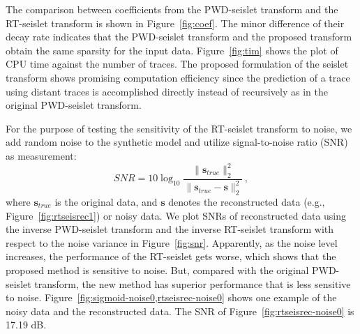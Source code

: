 
    The comparison between coefficients from the PWD-seislet transform and 
    the RT-seislet transform is shown in Figure~\ref{fig:coef}. 
    The minor difference of their decay rate indicates that the PWD-seislet 
    transform and the proposed transform obtain the same sparsity for the input 
    data.
    Figure~\ref{fig:tim} shows the plot of CPU time against the number of 
    traces. 
    The proposed formulation of the seislet transform shows promising 
    computation efficiency since the prediction of a trace using distant 
    traces is accomplished directly instead of recursively as in the original 
    PWD-seislet transform.


    For the purpose of testing the sensitivity of the RT-seislet transform to 
    noise, we add random noise to the synthetic model and utilize 
    signal-to-noise ratio (SNR) as measurement: 
    \begin{equation}
        \label{snr}
        SNR=10\log_{10}\frac{\|\mathbf{s}_{true}\|^2_2}
        {\|\mathbf{s}_{true}-\mathbf{s}\|^2_2}\,,
    \end{equation}
    where $\mathbf{s}_{true}$ is the original data, and $\mathbf{s}$ denotes
    the reconstructed data (e.g., Figure~\ref{fig:rtseisrec1}) or noisy data.
    We plot SNRs of reconstructed data using the inverse PWD-seislet transform 
    and the inverse RT-seislet transform with respect to the noise variance in 
    Figure~\ref{fig:snr}. 
    Apparently, as the noise level increases, the performance of the RT-seislet 
    gets worse, which shows that the proposed method is sensitive to noise. 
    But, compared with the original PWD-seislet transform, the new method has 
    superior performance that is less sensitive to noise.
    Figure~\ref{fig:sigmoid-noise0,rtseisrec-noise0} shows one example of the
    noisy data and the reconstructed data. The SNR of 
    Figure~\ref{fig:rtseisrec-noise0} is 17.19 dB.

